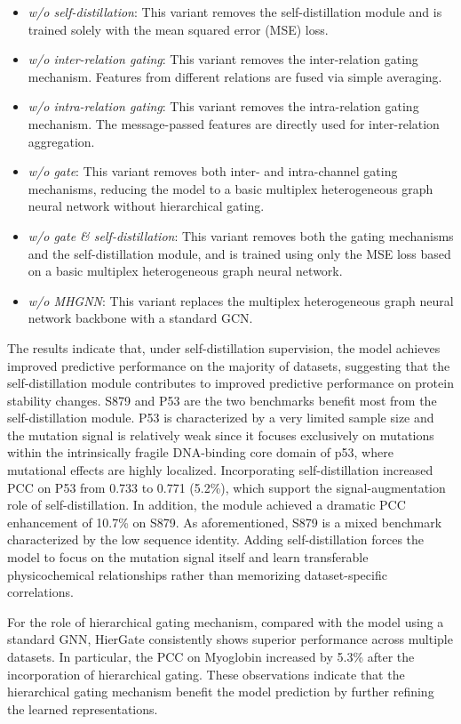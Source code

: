 \documentclass[journal,twoside,web]{ieeecolor}
\begin{document}
\begin{itemize}
\item \textit{w/o self-distillation}: This variant removes the self-distillation module and is trained solely with the mean squared error (MSE) loss.
\item \textit{w/o inter-relation gating}: This variant removes the inter-relation gating mechanism. Features from different relations are fused via simple averaging.
\item \textit{w/o intra-relation gating}: This variant removes the intra-relation gating mechanism. The message-passed features are directly used for inter-relation aggregation.
\item \textit{w/o gate}: This variant removes both inter- and intra-channel gating mechanisms, reducing the model to a basic multiplex heterogeneous graph neural network without hierarchical gating.
\item \textit{w/o gate \& self-distillation}: This variant removes both the gating mechanisms and the self-distillation module, and is trained using only the MSE loss based on a basic multiplex heterogeneous graph neural network.
\item \textit{w/o MHGNN}: This variant replaces the multiplex heterogeneous graph neural network backbone with a standard GCN.
\end{itemize}

The results indicate that, under self-distillation supervision, the model achieves improved predictive performance on the majority of datasets, suggesting that the self-distillation module contributes to improved predictive performance on protein stability changes. S879 and P53 are the two benchmarks benefit most from the self-distillation module. P53 is characterized by a very limited sample size and the mutation signal is relatively weak since it focuses exclusively on mutations within the intrinsically fragile DNA-binding core domain of p53, where mutational effects are highly localized. Incorporating self-distillation increased PCC on P53 from 0.733 to 0.771 (5.2\%), which support the signal-augmentation role of self-distillation. In addition, the module achieved a dramatic PCC enhancement of 10.7\% on S879. As aforementioned, S879 is a mixed benchmark characterized by the low sequence identity. Adding self-distillation forces the model to focus on the mutation signal itself and learn transferable physicochemical relationships rather than memorizing dataset-specific correlations.

For the role of hierarchical gating mechanism, compared with the model using a standard GNN, HierGate consistently shows superior performance across multiple datasets. In particular, the PCC on Myoglobin increased by 5.3\% after the incorporation of hierarchical gating. These observations indicate that the hierarchical gating mechanism benefit the model prediction by further refining the learned representations.
\end{document}
